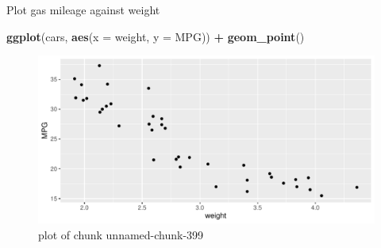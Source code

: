 \documentclass[ignorenonframetext,]{beamer}
\newenvironment{Shaded}{\begin{snugshade}}{\end{snugshade}}
\newcommand{\DataTypeTok}[1]{\textcolor[rgb]{0.13,0.29,0.53}{#1}}
\newcommand{\KeywordTok}[1]{\textcolor[rgb]{0.13,0.29,0.53}{\textbf{#1}}}
\newcommand{\NormalTok}[1]{#1}
\newcommand{\OperatorTok}[1]{\textcolor[rgb]{0.81,0.36,0.00}{\textbf{#1}}}
\newcommand{\StringTok}[1]{\textcolor[rgb]{0.31,0.60,0.02}{#1}}
\begin{document}
\begin{frame}[fragile]{Plot gas mileage against weight}
\protect\hypertarget{plot-gas-mileage-against-weight}{}

\begin{Shaded}
\begin{Highlighting}[]
\KeywordTok{ggplot}\NormalTok{(cars, }\KeywordTok{aes}\NormalTok{(}\DataTypeTok{x =}\NormalTok{ weight, }\DataTypeTok{y =}\NormalTok{ MPG)) }\OperatorTok{+}
\StringTok{  }\KeywordTok{geom_point}\NormalTok{()}
\end{Highlighting}
\end{Shaded}

\begin{figure}
\centering
\includegraphics{figure/unnamed-chunk-399-1.pdf}
\caption{plot of chunk unnamed-chunk-399}
\end{figure}

\end{frame}
\end{document}
